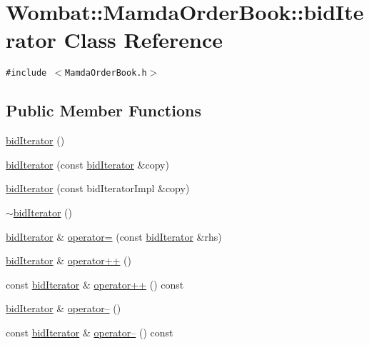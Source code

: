 \hypertarget{classWombat_1_1MamdaOrderBook_1_1bidIterator}{
\section{Wombat::Mamda\-Order\-Book::bid\-Iterator Class Reference}
\label{classWombat_1_1MamdaOrderBook_1_1bidIterator}
}
{\tt \#include $<$Mamda\-Order\-Book.h$>$}

\subsection*{Public Member Functions}
\begin{CompactItemize}
\item 
\hyperlink{classWombat_1_1MamdaOrderBook_1_1bidIterator_a227c7c17aedfc6f7091c9b6e7a1b8e6}{bid\-Iterator} ()
\item 
\hyperlink{classWombat_1_1MamdaOrderBook_1_1bidIterator_6060bf1ed5c54603d1dd2771fac73f9e}{bid\-Iterator} (const \hyperlink{classWombat_1_1MamdaOrderBook_1_1bidIterator}{bid\-Iterator} \&copy)
\item 
\hyperlink{classWombat_1_1MamdaOrderBook_1_1bidIterator_35528dfaaca0ee8b341923721549eb0c}{bid\-Iterator} (const bid\-Iterator\-Impl \&copy)
\item 
\hyperlink{classWombat_1_1MamdaOrderBook_1_1bidIterator_afacdf3cc9d428152ca34847126a2c5a}{$\sim$bid\-Iterator} ()
\item 
\hyperlink{classWombat_1_1MamdaOrderBook_1_1bidIterator}{bid\-Iterator} \& \hyperlink{classWombat_1_1MamdaOrderBook_1_1bidIterator_3db583c233e6207d7d331af999bbc657}{operator=} (const \hyperlink{classWombat_1_1MamdaOrderBook_1_1bidIterator}{bid\-Iterator} \&rhs)
\item 
\hyperlink{classWombat_1_1MamdaOrderBook_1_1bidIterator}{bid\-Iterator} \& \hyperlink{classWombat_1_1MamdaOrderBook_1_1bidIterator_14323e1f39cb756231a43e705f5b9a9c}{operator++} ()
\item 
const \hyperlink{classWombat_1_1MamdaOrderBook_1_1bidIterator}{bid\-Iterator} \& \hyperlink{classWombat_1_1MamdaOrderBook_1_1bidIterator_a83a584c4822f23298d2264e9d56036c}{operator++} () const 
\item 
\hyperlink{classWombat_1_1MamdaOrderBook_1_1bidIterator}{bid\-Iterator} \& \hyperlink{classWombat_1_1MamdaOrderBook_1_1bidIterator_3f49dff8e4fbbd44d6e27d712305f756}{operator--} ()
\item 
const \hyperlink{classWombat_1_1MamdaOrderBook_1_1bidIterator}{bid\-Iterator} \& \hyperlink{classWombat_1_1MamdaOrderBook_1_1bidIterator_251a11b56200b78030fd94c8da915ceb}{operator--} () const 

\end{CompactItemize}
